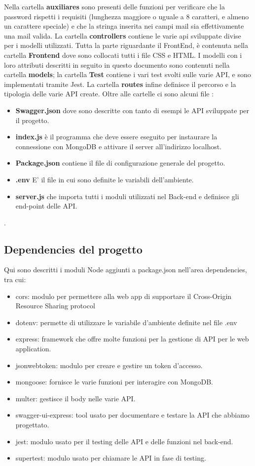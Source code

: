 \documentclass{article}
\begin{document}
Nella cartella \textbf{auxiliares} sono presenti delle funzioni per verificare che la password rispetti i requisiti (lunghezza maggiore o uguale  a 8 caratteri, e almeno un carattere speciale) e che la stringa inserita nei campi mail sia effettivamente una mail valida.
La cartella \textbf{controllers} contiene le varie api sviluppate divise per i modelli utilizzati. Tutta la parte riguardante il FrontEnd, è contenuta nella cartella \textbf{Frontend} dove sono collocati tutti i file CSS e HTML. 
I modelli con i loro attributi descritti in seguito in questo documento sono contenuti nella cartella \textbf{models};
la cartella \textbf{Test} contiene i vari test svolti sulle varie API, e sono implementati tramite Jest. La cartella \textbf{routes} infine definisce il percorso e la tipologia delle varie API create.
Oltre alle cartelle ci sono alcuni file :
\begin{itemize}
    \item \textbf{Swagger.json} dove sono descritte con tanto di esempi le API sviluppate per il progetto.
    \item \textbf{index.js} è il programma che deve essere eseguito per instaurare la connessione con MongoDB e attivare il server all'indirizzo localhost.
    \item \textbf{Package.json} contiene il file di configurazione generale del progetto.
    \item \textbf{.env} E' il file in cui sono definite le variabili dell'ambiente.
    \item \textbf{server.js} che importa tutti i moduli utilizzati nel Back-end e definisce gli end-point delle API.
\end{itemize}.

\subsection{Dependencies del progetto}
Qui sono descritti i moduli Node aggiunti a package.json nell'area dependencies, tra cui:
\begin{itemize}
    \item cors: modulo per permettere alla web app di supportare il Cross-Origin Resource Sharing protocol
    \item dotenv: permette di utilizzare le variabile d’ambiente definite nel file .env
    \item express: framework che offre molte funzioni per la gestione di API per le web application.
    \item jsonwebtoken: modulo per creare e gestire un token d’accesso.
    \item mongoose: fornisce le varie funzioni per interagire con MongoDB.
    \item multer: gestisce il body nelle varie API.
    \item swagger-ui-express: tool usato per documentare e testare la API che abbiamo progettato.
    \item jest: modulo usato per il testing delle API e delle funzioni nel back-end.
    \item supertest: modulo usato per chiamare le API in fase di testing.
\end{itemize}
\end{document}
